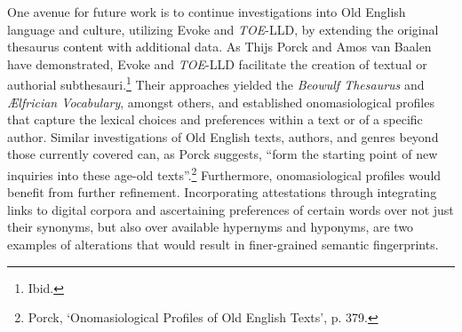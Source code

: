 
One avenue for future work is to continue investigations into Old English language and culture, utilizing Evoke and \textit{TOE}-LLD, by extending the original thesaurus content with additional data. As Thijs Porck and Amos van Baalen have demonstrated, Evoke and \textit{TOE}-LLD facilitate the creation of textual or authorial subthesauri.\footnote{Ibid.} %
Their approaches yielded the \textit{Beowulf Thesaurus} and \textit{Ælfrician Vocabulary}, amongst others, and established onomasiological profiles that capture the lexical choices and preferences within a text or of a specific author. Similar investigations of Old English texts, authors, and genres beyond those currently covered can, as Porck suggests, ``form the starting point of new inquiries into these age-old texts''.\footnote{Porck, `Onomasiological Profiles of Old English Texts', p. 379.} Furthermore, onomasiological profiles would benefit from further refinement. Incorporating attestations through integrating links to digital corpora and ascertaining preferences of certain words over not just their synonyms, but also over available hypernyms and hyponyms, are two examples of alterations that would result in finer-grained semantic fingerprints. 

